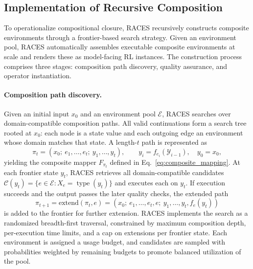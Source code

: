 \subsection{Implementation of Recursive Composition}
\label{sec:construction}

To operationalize compositional closure, RACES recursively constructs composite environments through a frontier-based search strategy.
Given an environment pool, RACES automatically assembles executable composite environments at scale and renders these as model-facing RL instances.
The construction process comprises three stages: composition path discovery, quality assurance, and operator instantiation.

\paragraph{Composition path discovery.}
Given an initial input $x_0$ and an environment pool $\mathcal{E}$, RACES searches over domain-compatible composition paths. All valid continuations form a search tree rooted at $x_0$: each node is a state value and each outgoing edge an environment whose domain matches that state. A length-$t$ path is represented as
\begin{equation}
\pi_t = (x_0;\ e_1,\ldots,e_t;\ y_1,\ldots,y_t),
\qquad y_i=f_{e_i}(\mathcal{Y}_{i-1}),\quad y_0=x_0,
\label{eq:path}
\end{equation}
yielding the composite mapper $F_{\pi_t}$ defined in Eq.~\eqref{eq:composite_mapping}. At each frontier state $y_t$, RACES retrieves all domain-compatible candidates $\mathcal{C}(y_t)=\{e\in\mathcal{E}:X_e=\operatorname{type}(y_t)\}$ and executes each on $y_t$. If execution succeeds and the output passes the later quality checks, the extended path
\begin{equation}
\pi_{t+1}=\mathrm{extend}(\pi_t, e)=(x_0;\ e_1,\ldots,e_t,e;\ y_1,\ldots,y_t,f_e(y_t))
\label{eq:path_extension}
\end{equation}
is added to the frontier for further extension.
RACES implements the search as a randomized breadth-first traversal, constrained by maximum composition depth, per-execution time limits, and a cap on extensions per frontier state. Each environment is assigned a usage budget, and candidates are sampled with probabilities weighted by remaining budgets to promote balanced utilization of the pool.

